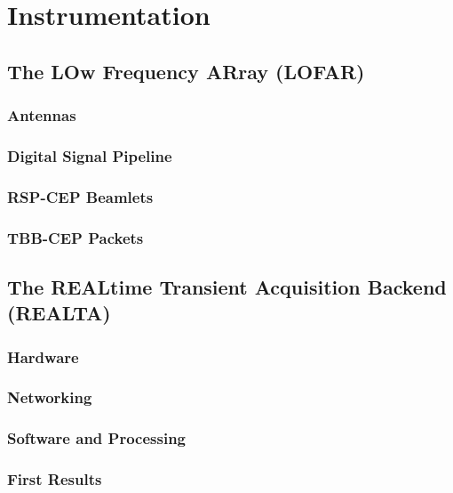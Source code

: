 \onehalfspacing
\chapter{Instrumentation}

\section{The LOw Frequency ARray (LOFAR)}
\subsection{Antennas}
\subsection{Digital Signal Pipeline}
\subsection{RSP-CEP Beamlets}
\subsection{TBB-CEP Packets}
\section{The REALtime Transient Acquisition Backend (REALTA)}
\subsection{Hardware}
\subsection{Networking}
\subsection{Software and Processing}
\subsection{First Results}